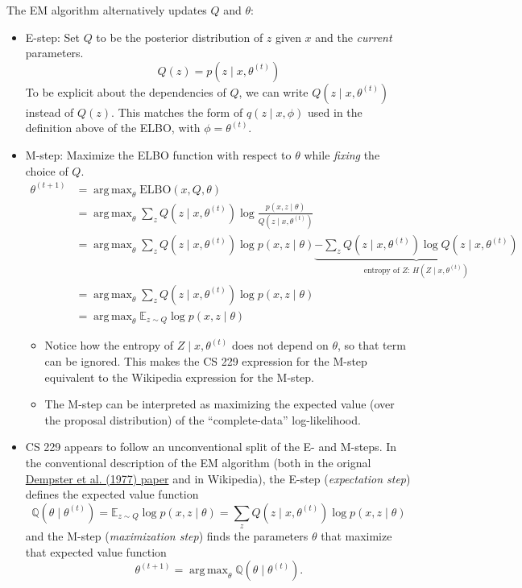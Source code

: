 \documentclass[11pt]{article}
\theoremstyle{definition}
\DeclareMathOperator*{\argmax}{arg\,max}
\begin{document}
The EM algorithm alternatively updates $Q$ and $\theta$:
\begin{itemize}
    \item E-step: Set $Q$ to be the posterior distribution of $z$ given $x$ and the \textit{current} parameters.
    $$
    Q(z) = p(z \mid x, \theta^{(t)})
    $$
    To be explicit about the dependencies of $Q$, we can write $Q(z \mid x, \theta^{(t)})$ instead of $Q(z)$. This matches the form of $q(z \mid x, \phi)$ used in the definition above of the ELBO, with $\phi = \theta^{(t)}$.
    \item M-step: Maximize the ELBO function with respect to $\theta$ while \textit{fixing} the choice of $Q$.
    $$
    \begin{aligned}
    \theta^{(t+1)}
    &= \argmax_\theta \text{ELBO}(x, Q, \theta) \\
    &= \argmax_\theta \sum_z Q(z \mid x, \theta^{(t)}) \log \frac{p(x, z \mid \theta)}{Q(z \mid x, \theta^{(t)})} \\
    &= \argmax_\theta \sum_z Q(z \mid x, \theta^{(t)}) \log p(x, z \mid \theta) \underbrace{- \sum_z Q(z \mid x, \theta^{(t)}) \log Q(z \mid x, \theta^{(t)})}_{\text{entropy of } Z: \, H(Z \mid x, \theta^{(t)})} \\
    &= \argmax_\theta \sum_z Q(z \mid x, \theta^{(t)}) \log p(x, z \mid \theta) \\
    &= \argmax_\theta \mathbb{E}_{z \sim Q} \log p(x, z \mid \theta)
    \end{aligned}
    $$
    \begin{itemize}
        \item Notice how the entropy of $Z \mid x, \theta^{(t)}$ does not depend on $\theta$, so that term can be ignored. This makes the CS 229 expression for the M-step equivalent to the Wikipedia expression for the M-step.
        \item The M-step can be interpreted as maximizing the expected value (over the proposal distribution) of the ``complete-data'' log-likelihood.
    \end{itemize}
    \item CS 229 appears to follow an unconventional split of the E- and M-steps. In the conventional description of the EM algorithm (both in the orignal \href{https://doi.org/10.1111/j.2517-6161.1977.tb01600.x}{Dempster et al. (1977) paper} and in Wikipedia), the E-step (\textit{expectation step}) defines the expected value function
    $$
    \mathbb{Q}(\theta \mid \theta^{(t)}) = \mathbb{E}_{z \sim Q} \log p(x, z \mid \theta) = \sum_{z} Q(z \mid x, \theta^{(t)}) \log p(x, z \mid \theta)
    $$
and the M-step (\textit{maximization step}) finds the parameters $\theta$ that maximize that expected value function
$$
\theta^{(t+1)} = \argmax_\theta \mathbb{Q}(\theta \mid \theta^{(t)}).
$$
\end{itemize}
\end{document}
